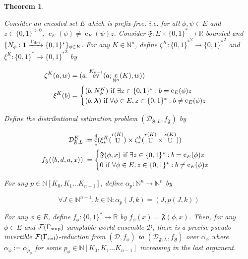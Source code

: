 \documentclass{article}
\numberwithin{equation}{section}
\theoremstyle{definition}
\theoremstyle{plain}
\newtheorem{theorem}{Theorem}[section]
\newcommand{\Bool}{\{0,1\}}
\newcommand{\Words}{{\Bool^*}}
\DeclareMathOperator{\Ev}{ev}
\DeclareMathOperator{\Un}{U}
\DeclareMathOperator{\En}{c}
\newcommand{\Nats}{\mathbb{N}}
\newcommand{\Reals}{\mathbb{R}}
\newcommand{\NatPoly}{\Nats[K_0, K_1 \ldots K_{n-1}]}
\newcommand{\NatFun}{\Nats^n \rightarrow}
\newcommand{\Estr}{\bm{\lambda}}
\newcommand{\Chev}[1]{\langle #1 \rangle}
\newcommand{\Dist}{\mathcal{D}}
\newcommand{\Fall}{\mathcal{F}}
\begin{document}
\begin{samepage}
\begin{theorem}
\label{thm:complete}

Consider an encoded set ${E}$ which is prefix-free, i.e. for all ${\phi,\psi \in E}$ and ${z \in \Bool^{>0}}$, ${\En_E(\phi) \ne \En_E(\psi)z}$. Consider ${\mathfrak{F}: E \times \Words \rightarrow \Reals}$ bounded and ${\{N_\phi: \bm{1} \xrightarrow{\Gamma_{\textnormal{det}}} \Words\}_{\phi \in E}}$. For any ${K \in \Nats^n}$, define ${\zeta^K: \Words^2 \rightarrow \Words^2}$ and ${\xi^K: \Words \rightarrow \Words^2}$ by 

\begin{align}
\zeta^K(a,w)&=(a,\Ev^{K_{n-1}}(a;\En_{\Nats^n}(K),w))\\
\xi^K(b)&=\begin{cases}(b,N_\phi^K) \textnormal{ if } \exists z \in \Words: b=\En_E(\phi)z \\ (b,\Estr) \textnormal{ if } \forall \phi \in E, z \in \Words: b \ne \En_E(\phi)z\end{cases}
\end{align}

Define the distributional estimation problem $({\Dist_{\mathfrak{F},L}},f_{\mathfrak{F}})$ by 

\begin{align}
\Dist_{\mathfrak{F},L}^K&:=\En_*^4 (\xi_*^K(\Un^{r(K)}) \times \zeta_*^k(\Un^{r(K)} \times \Un^{s(K)})) \\
f_{\mathfrak{F}}(\Chev{b,d,a,x}) &:= \begin{cases}\mathfrak{F}(\phi, x) \textnormal{ if } \exists z \in \Words: b=\En_E(\phi)z \\ 0 \textnormal{ if } \forall \phi \in E, z \in \Words: b \ne \En_E(\phi)z\end{cases}
\end{align}

For any ${p \in \NatPoly}$, define ${\alpha_p: \NatFun \Nats^n}$ by

\begin{equation}
\forall J \in \Nats^{n-1}, k \in \Nats: \alpha_p(J,k) = (J,p(J,k))
\end{equation}

For any ${\phi \in E}$, define ${f_\phi: \Words \rightarrow \Reals}$ by ${f_\phi(x)=\mathfrak{F}(\phi,x)}$. Then, for any ${\phi \in E}$ and ${\Fall(\Gamma_{\textnormal{smp}})}$-samplable world ensemble ${\Dist}$, there is a precise pseudo-invertible ${\Fall(\Gamma_{\textnormal{red}})}$-reduction from ${(\Dist,f_\phi)}$ to ${(\Dist_{\mathfrak{F},L}, f_{\mathfrak{F}})}$ over ${\alpha_{\phi}}$ where ${\alpha_\phi:=\alpha_{p_\phi}}$ for some ${p_\phi \in \NatPoly}$ increasing in the last argument.

\end{theorem}
\end{samepage}
\end{document}
